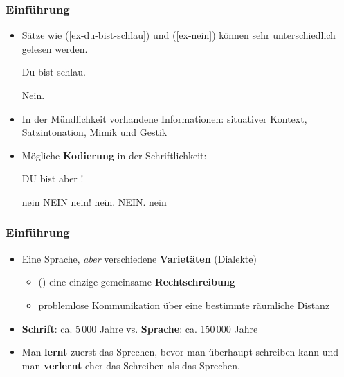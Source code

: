 \begin{frame}
\frametitle{Einführung}

\begin{itemize}
	\item Sätze wie (\ref{ex-du-bist-schlau}) und (\ref{ex-nein}) können sehr unterschiedlich gelesen werden.

	\ea\label{ex-du-bist-schlau}
	Du bist schlau.

	\ex\label{ex-nein}
	Nein.
	\z
	
\pause		

\item In der Mündlichkeit vorhandene Informationen: situativer Kontext, Satzintonation, Mimik und Gestik

\item Mögliche \textbf{Kodierung} in der Schriftlichkeit:

	\ea
	DU bist aber !

\begin{multicols}{2}
	\ex 
		\ea nein
		\ex NEIN
		\ex nein!
		\ex nein.
		\ex NEIN.
		\ex *nein
		\z
\end{multicols}

	\z

\end{itemize}		

\end{frame}


\begin{frame}
\frametitle{Einführung}

\begin{itemize}
	\item Eine Sprache, \emph{aber} verschiedene \textbf{Varietäten} (Dialekte)
	
	\begin{itemize}
		\item (\idR) eine einzige gemeinsame \textbf{Rechtschreibung}

		\item problemlose Kommunikation über eine bestimmte räumliche Distanz	

	\end{itemize}

\pause

	\item \textbf{Schrift}: ca. 5\,000 Jahre vs. \textbf{Sprache}: ca. 150\,000 Jahre

	\item Man \textbf{lernt} zuerst das Sprechen, bevor man überhaupt schreiben kann und man \textbf{verlernt} eher das Schreiben als das Sprechen.
\end{itemize}

\end{frame}


